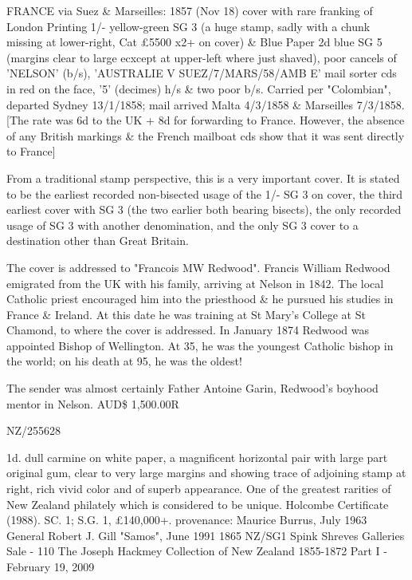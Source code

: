 \documentclass[justified]{tufte-book}
\begin{document}
%
{FRANCE via Suez \& Marseilles: 1857 (Nov 18) cover with rare franking of London Printing 1/- yellow-green SG 3 (a huge stamp, sadly with a chunk missing at lower-right, Cat £5500 x2+ on cover) \& Blue Paper 2d blue SG 5 (margins clear to large ecxcept at upper-left where just shaved), poor cancels of 'NELSON' (b/s), 'AUSTRALIE V SUEZ/7/MARS/58/AMB E' mail sorter cds in red on the face, '5' (decimes) h/s \& two poor b/s. Carried per "Colombian", departed Sydney 13/1/1858; mail arrived Malta 4/3/1858 \& Marseilles 7/3/1858. [The rate was 6d to the UK + 8d for forwarding to France. However, the absence of any British markings \& the French mailboat cds show that it was sent directly to France] 

From a traditional stamp perspective, this is a very important cover. It is stated to be the earliest recorded non-bisected usage of the 1/- SG 3 on cover, the third earliest cover with SG 3 (the two earlier both bearing bisects), the only recorded usage of SG 3 with another denomination, and the only SG 3 cover to a destination other than Great Britain.

The cover is addressed to "Francois MW Redwood". Francis William Redwood emigrated from the UK with his family, arriving at Nelson in 1842. The local Catholic priest encouraged him into the priesthood \& he pursued his studies in France \& Ireland. At this date he was training at St Mary's College at St Chamond, to where the cover is addressed. In January 1874 Redwood was appointed Bishop of Wellington. At 35, he was the youngest Catholic bishop in the world; on his death at 95, he was the oldest! 

The sender was almost certainly Father Antoine Garin, Redwood's boyhood mentor in Nelson. AUD\$ 1,500.00R}%
{NZ/255628}%
{}%
{}
{}%
{}




%
{1d. dull carmine on white paper, a magnificent horizontal pair with large part original gum, clear to very large margins and showing trace of adjoining stamp at right, rich vivid color and of superb appearance. One of the greatest rarities of New Zealand philately which is considered to be unique. Holcombe Certificate (1988). SC. 1; S.G. 1, \pounds{140,000}+. provenance: Maurice Burrus, July 1963 General Robert J. Gill "Samos", June 1991}%
{1865}%
{NZ/SG1}%
{Spink Shreves Galleries Sale - 110
The Joseph Hackmey Collection of New Zealand 1855-1872 Part I - February 19, 2009}%
{}
{}%
{}%
 
\end{document}
